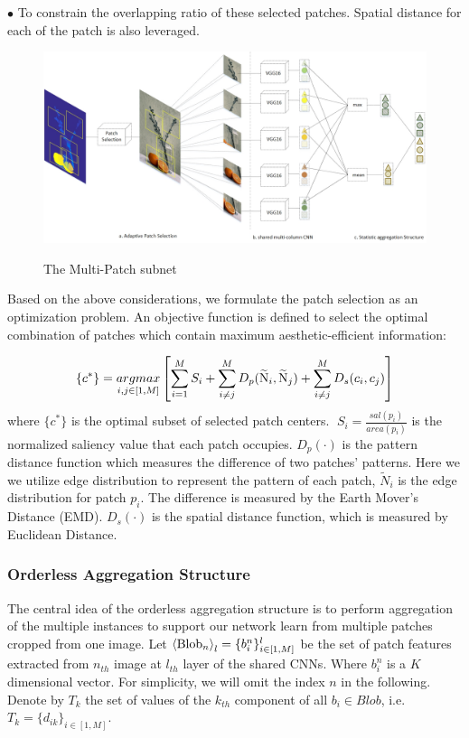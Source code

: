 \documentclass[10pt,twocolumn,letterpaper]{article}
\begin{document}
$\bullet$ To constrain the overlapping ratio of these selected patches. 
Spatial distance for each of the patch is also leveraged. 

\begin{figure}
	\centering
	\includegraphics[scale=0.45]{figures/multi_patch_subnet.jpg}
	\label{multi_patch}
	\caption{The Multi-Patch subnet}
\end{figure}

Based on the above considerations, we formulate the patch selection as an 
optimization problem.  An objective function is defined to select the 
optimal combination of patches which contain maximum aesthetic-efficient 
information:

\[\{ {c^ * }\}  = \mathop {argmax}\limits_{i,j \in [1,M]} \left[ {\sum\limits_{i = 1}^M {{S_i}}  + \sum\limits_{i \ne j}^M {{D_p}({{\widetilde {\rm N}}_i},{{\widetilde {\rm N}}_j}) + \sum\limits_{i \ne j}^M {{D_s}({c_i},{c_j})} } } \right]\]
where $\{ {c^ * }\} $ is the optimal subset of selected patch centers. $\;{S_i} = \frac{{sal({p_i})}}{{area({p_i})}}$ is the normalized saliency value that 
each patch occupies. ${D_p}( \cdot )$ is the pattern distance function which 
measures the difference of two patches' patterns. Here we we utilize 
edge distribution to represent the pattern of each patch, ${{\tilde N}_i}$ 
is the edge distribution for patch $p_i$. The difference is measured by the 
Earth Mover's Distance (EMD). ${D_s}( \cdot )$ is the spatial distance function, which is measured by Euclidean Distance.

\subsubsection{Orderless Aggregation Structure}
The central idea of the orderless aggregation structure is to perform 
aggregation of the multiple instances to support our network learn from multiple patches cropped from one image.
Let ${\left\langle {{\rm{Blo}}{{\rm{b}}_n}} \right\rangle _{l}} = \{ b_i^n\} _{i \in [1,M]}^{l}$ be the set of patch features extracted from $n_{th}$ image 
at $l_{th}$ layer of the shared CNNs. Where $b_i^n$ is a $K$ dimensional vector.
For simplicity, we will omit the index $n$ in the following. 
Denote by $T_k$ the set of values
of the $k_{th}$ component of all ${b_i} \in Blob$, i.e. ${T_k} = {\{ {d_{ik}}\} _{i \in [1,M]}}$.
\end{document}
